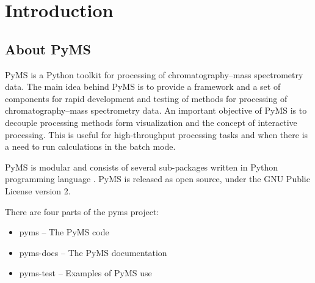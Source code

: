 

\chapter{Introduction}

\section{About PyMS}

PyMS is a Python toolkit for processing of chromatography--mass spectrometry
data. The main idea behind PyMS is to provide a framework and a set of
components for rapid development and testing of methods for processing of
chromatography--mass spectrometry data. An important objective of PyMS is
to decouple processing methods form visualization and the concept of
interactive processing. This is useful for high-throughput processing tasks
and when there is a need to run calculations in the batch mode.

PyMS is modular and consists of several sub-packages written in Python
programming language \cite{python}. PyMS is released as open source,
under the GNU Public License version 2.

There are four parts of the pyms project:

\begin{itemize}
  \item pyms -- The PyMS code
  \item pyms-docs -- The PyMS documentation
  \item pyms-test -- Examples of PyMS use
\end{itemize}

